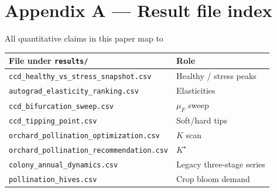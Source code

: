 \documentclass[12pt]{article}
\newcommand{\muF}{\mu_{F}}
\begin{document}
\appendix
\section*{Appendix A --- Result file index}
All quantitative claims in this paper map to
\begin{center}
\begin{tabular}{ll}
\toprule
File under \texttt{results/} & Role \\
\midrule
\texttt{ccd\_healthy\_vs\_stress\_snapshot.csv} & Healthy / stress peaks \\
\texttt{autograd\_elasticity\_ranking.csv} & Elasticities \\
\texttt{ccd\_bifurcation\_sweep.csv} & \(\muF\) sweep \\
\texttt{ccd\_tipping\_point.csv} & Soft/hard tips \\
\texttt{orchard\_pollination\_optimization.csv} & \(K\) scan \\
\texttt{orchard\_pollination\_recommendation.csv} & \(K^\star\) \\
\texttt{colony\_annual\_dynamics.csv} & Legacy three-stage series \\
\texttt{pollination\_hives.csv} & Crop bloom demand \\
\bottomrule
\end{tabular}
\end{center}
\end{document}
